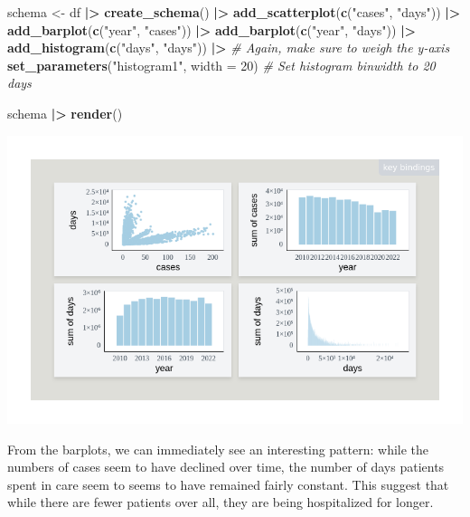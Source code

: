 \documentclass[
]{book}
\newenvironment{Shaded}{\begin{snugshade}}{\end{snugshade}}
\newcommand{\AttributeTok}[1]{\textcolor[rgb]{0.13,0.29,0.53}{#1}}
\newcommand{\CommentTok}[1]{\textcolor[rgb]{0.56,0.35,0.01}{\textit{#1}}}
\newcommand{\DecValTok}[1]{\textcolor[rgb]{0.00,0.00,0.81}{#1}}
\newcommand{\FunctionTok}[1]{\textcolor[rgb]{0.13,0.29,0.53}{\textbf{#1}}}
\newcommand{\NormalTok}[1]{#1}
\newcommand{\OtherTok}[1]{\textcolor[rgb]{0.56,0.35,0.01}{#1}}
\newcommand{\SpecialCharTok}[1]{\textcolor[rgb]{0.81,0.36,0.00}{\textbf{#1}}}
\newcommand{\StringTok}[1]{\textcolor[rgb]{0.31,0.60,0.02}{#1}}
\theoremstyle{definition}
\theoremstyle{definition}
\theoremstyle{definition}
\theoremstyle{definition}
\theoremstyle{remark}
\begin{document}
\begin{Shaded}
\begin{Highlighting}[]
\NormalTok{schema }\OtherTok{\textless{}{-}}\NormalTok{ df }\SpecialCharTok{|\textgreater{}}
  \FunctionTok{create\_schema}\NormalTok{() }\SpecialCharTok{|\textgreater{}}
  \FunctionTok{add\_scatterplot}\NormalTok{(}\FunctionTok{c}\NormalTok{(}\StringTok{"cases"}\NormalTok{, }\StringTok{"days"}\NormalTok{)) }\SpecialCharTok{|\textgreater{}}
  \FunctionTok{add\_barplot}\NormalTok{(}\FunctionTok{c}\NormalTok{(}\StringTok{"year"}\NormalTok{, }\StringTok{"cases"}\NormalTok{)) }\SpecialCharTok{|\textgreater{}}
  \FunctionTok{add\_barplot}\NormalTok{(}\FunctionTok{c}\NormalTok{(}\StringTok{"year"}\NormalTok{, }\StringTok{"days"}\NormalTok{)) }\SpecialCharTok{|\textgreater{}}
  \FunctionTok{add\_histogram}\NormalTok{(}\FunctionTok{c}\NormalTok{(}\StringTok{"days"}\NormalTok{, }\StringTok{"days"}\NormalTok{)) }\SpecialCharTok{|\textgreater{}} \CommentTok{\# Again, make sure to weigh the y{-}axis}
  \FunctionTok{set\_parameters}\NormalTok{(}\StringTok{"histogram1"}\NormalTok{, }\AttributeTok{width =} \DecValTok{20}\NormalTok{) }\CommentTok{\# Set histogram binwidth to 20 days}

\NormalTok{schema }\SpecialCharTok{|\textgreater{}} \FunctionTok{render}\NormalTok{()}
\end{Highlighting}
\end{Shaded}

\begin{center}\includegraphics[width=1\linewidth,height=1\textheight]{./figures/example-cases-days-time} \end{center}

From the barplots, we can immediately see an interesting pattern: while the numbers of cases seem to have declined over time, the number of days patients spent in care seem to seems to have remained fairly constant. This suggest that while there are fewer patients over all, they are being hospitalized for longer.
\end{document}
